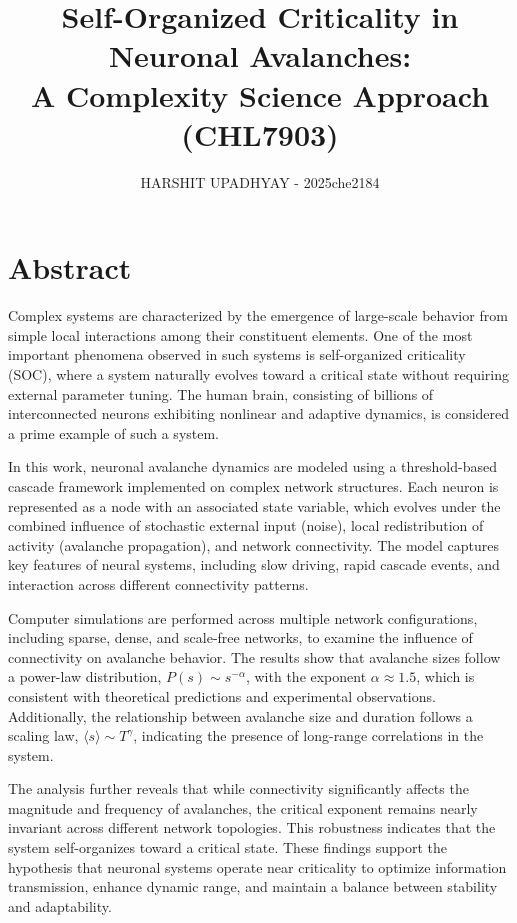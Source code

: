 \documentclass[12pt]{article}
\title{Self-Organized Criticality in Neuronal Avalanches:\\
A Complexity Science Approach (CHL7903)}
\author{HARSHIT UPADHYAY - 2025che2184}
\date{}
\begin{document}
\maketitle
\newpage
\section{Abstract}

Complex systems are characterized by the emergence of large-scale behavior from simple local interactions among their constituent elements. One of the most important phenomena observed in such systems is self-organized criticality (SOC), where a system naturally evolves toward a critical state without requiring external parameter tuning. The human brain, consisting of billions of interconnected neurons exhibiting nonlinear and adaptive dynamics, is considered a prime example of such a system.

In this work, neuronal avalanche dynamics are modeled using a threshold-based cascade framework implemented on complex network structures. Each neuron is represented as a node with an associated state variable, which evolves under the combined influence of stochastic external input (noise), local redistribution of activity (avalanche propagation), and network connectivity. The model captures key features of neural systems, including slow driving, rapid cascade events, and interaction across different connectivity patterns.

Computer simulations are performed across multiple network configurations, including sparse, dense, and scale-free networks, to examine the influence of connectivity on avalanche behavior. The results show that avalanche sizes follow a power-law distribution, \( P(s) \sim s^{-\alpha} \), with the exponent \( \alpha \approx 1.5 \), which is consistent with theoretical predictions and experimental observations. Additionally, the relationship between avalanche size and duration follows a scaling law, \( \langle s \rangle \sim T^{\gamma} \), indicating the presence of long-range correlations in the system.

The analysis further reveals that while connectivity significantly affects the magnitude and frequency of avalanches, the critical exponent remains nearly invariant across different network topologies. This robustness indicates that the system self-organizes toward a critical state. These findings support the hypothesis that neuronal systems operate near criticality to optimize information transmission, enhance dynamic range, and maintain a balance between stability and adaptability.
\end{document}
